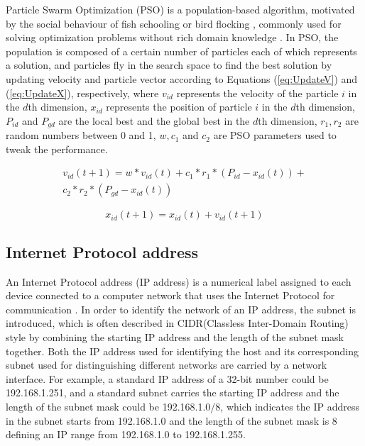 \documentclass[conference]{IEEEtran}
\begin{document}
Particle Swarm Optimization (PSO) is a population-based algorithm, motivated by the social behaviour of fish schooling or bird flocking \cite{PSOIntro:Kennedy} \cite{PSOIntro:Eberhart}, commonly used for solving optimization problems without rich domain knowledge \cite{PSOIntro:Yanan}. In PSO, the population is composed of a certain number of particles each of which represents a solution, and particles fly in the search space to find the best solution by updating velocity and particle vector according to Equations (\ref{eq:UpdateV}) and (\ref{eq:UpdateX}), respectively, where $v_{id}$ represents the velocity of the particle $i$ in the $d$th dimension, $x_{id}$ represents the position of particle $i$ in the $d$th dimension, $P_{id}$ and $P_{gd}$ are the local best and the global best in the $d$th dimension, $r_{1}, r_{2}$ are random numbers between 0 and 1, $w, c_{1}$ and $c_{2}$ are PSO parameters used to tweak the performance. 

\begin{equation}\label{eq:UpdateV}
	\begin{aligned}
	v_{id}(t+1) = w * v_{id}(t) + c_{1} * r_{1} * (P_{id} - x_{id}(t)) + \\
	c_{2} * r_{2} * (P_{gd} - x_{id}(t))
	\end{aligned}
\end{equation}

\begin{equation}\label{eq:UpdateX}
	x_{id}(t+1) = x_{id}(t) + v_{id}(t+1)
\end{equation}

\subsection{Internet Protocol address}\label{sec:IPAddress}

An Internet Protocol address (IP address) is a numerical label assigned to each device connected to a computer network that uses the Internet Protocol for communication \cite{IP:Postel}. In order to identify the network of an IP address, the subnet is introduced, which is often described in CIDR(Classless Inter-Domain Routing) style \cite{CIDR:Fuller} by combining the starting IP address and the length of the subnet mask together. Both the IP address used for identifying the host and its corresponding subnet used for distinguishing different networks are carried by a network interface. For example, a standard IP address of a 32-bit number could be 192.168.1.251, and a standard subnet carries the starting IP address and the length of the subnet mask could be 192.168.1.0/8, which indicates the IP address in the subnet starts from 192.168.1.0 and the length of the subnet mask is 8 defining an IP range from 192.168.1.0 to 192.168.1.255. 
\end{document}
